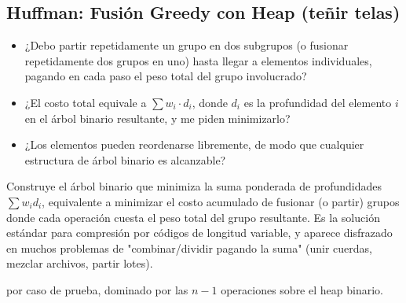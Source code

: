 \subsection{Huffman: Fusión Greedy con Heap (teñir telas)}
\label{alg:5-4}


\begin{itemize}
\item ¿Debo partir repetidamente un grupo en dos subgrupos (o fusionar repetidamente dos grupos en uno) hasta llegar a elementos individuales, pagando en cada paso el peso total del grupo involucrado?
\item ¿El costo total equivale a $\sum w_i \cdot d_i$, donde $d_i$ es la profundidad del elemento $i$ en el árbol binario resultante, y me piden minimizarlo?
\item ¿Los elementos pueden reordenarse libremente, de modo que cualquier estructura de árbol binario es alcanzable?
\end{itemize}

 Construye el árbol binario que minimiza la suma ponderada de profundidades $\sum w_i d_i$, equivalente a minimizar el costo acumulado de fusionar (o partir) grupos donde cada operación cuesta el peso total del grupo resultante. Es la solución estándar para compresión por códigos de longitud variable, y aparece disfrazado en muchos problemas de "combinar/dividir pagando la suma" (unir cuerdas, mezclar archivos, partir lotes).

  por caso de prueba, dominado por las $n-1$ operaciones sobre el heap binario.

